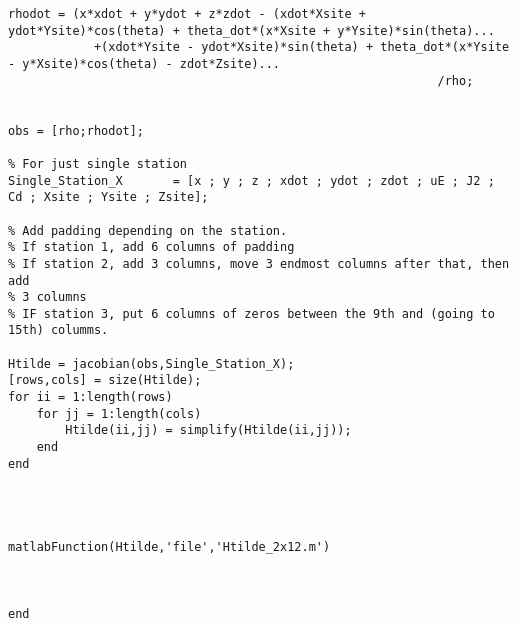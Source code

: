 \documentclass[12pt,a4paper,oneside]{article}
\numberwithin{equation}{section}   		%
\begin{document}
\begin{appendices}
\begin{lstlisting}
rhodot = (x*xdot + y*ydot + z*zdot - (xdot*Xsite + ydot*Ysite)*cos(theta) + theta_dot*(x*Xsite + y*Ysite)*sin(theta)...
            +(xdot*Ysite - ydot*Xsite)*sin(theta) + theta_dot*(x*Ysite - y*Xsite)*cos(theta) - zdot*Zsite)...
                                                            /rho;
                                                        
                                                        
obs = [rho;rhodot];

% For just single station
Single_Station_X       = [x ; y ; z ; xdot ; ydot ; zdot ; uE ; J2 ; Cd ; Xsite ; Ysite ; Zsite];

% Add padding depending on the station. 
% If station 1, add 6 columns of padding
% If station 2, add 3 columns, move 3 endmost columns after that, then add
% 3 columns
% IF station 3, put 6 columns of zeros between the 9th and (going to 15th) columms. 

Htilde = jacobian(obs,Single_Station_X);
[rows,cols] = size(Htilde);
for ii = 1:length(rows)
    for jj = 1:length(cols)
        Htilde(ii,jj) = simplify(Htilde(ii,jj));
    end
end

                             


matlabFunction(Htilde,'file','Htilde_2x12.m')



end

\end{lstlisting}


\end{appendices}
\end{document}
